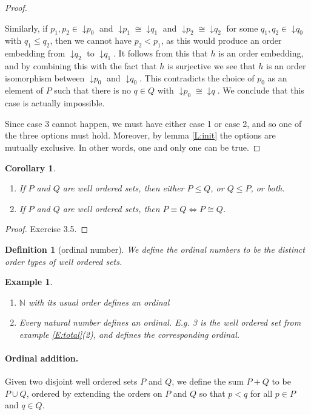 \documentclass{article}
\theoremstyle{plain}
\newtheorem{definition}[theorem]{Definition}{\bfseries}{\upshape}
\newtheorem{example}[theorem]{Example}{\bfseries}{\upshape}
\newtheorem{corollary}[theorem]{Corollary}{\bfseries}{\upshape}
\newcommand{\bN}{\mathbb{N}}
\DeclareMathOperator{\ISp}{\downarrow \mathit{p}}
\DeclareMathOperator{\ISq}{\downarrow \mathit{q}}
\begin{document}
\begin{proof}
\begin{itemize}
\begin{itemize}
Similarly, if $p_1,p_2\in \ISp_0$ and $\ISp_1 \cong \ISq_1$ and $\ISp_2 \cong \ISq_2$ for some $q_1,q_2\in \ISq_0$ with $q_1\leq q_2$, then we cannot have $p_2< p_1$, as this would produce an order embedding from $\ISq_2$ to $\ISq_1$.  It follows from this that $h$ is an order embedding, and by combining this with the fact that $h$ is surjective we see that $h$ is an order isomorphism between $\ISp_0$ and $\ISq_0$. This contradicts the choice of $p_0$ as an element of $P$ such that there is no $q\in Q$ with $\ISp_0\cong \ISq$. We conclude that this case is actually impossible.
\end{itemize}
\end{itemize}
Since case 3 cannot happen, we must have either case 1 or case 2, and so one of the three options must hold. Moreover, by lemma \ref{L:init} the options are mutually exclusive. In other words, one and only one can be true.  
\end{proof}

\begin{corollary}\label{C:isom}\mbox{}
\begin{enumerate}
\item If $P$ and $Q$ are well ordered sets, then either $P\leq Q$, or $Q\leq P$, or both.
\item If $P$ and $Q$ are well ordered sets, then $P\equiv Q\iff P\cong Q$.
\end{enumerate}
\end{corollary}
\begin{proof}
Exercise 3.5.
\end{proof}

\begin{definition}[ordinal number]
We define the \emph{ordinal numbers} to be the distinct order types of well ordered sets.  
\end{definition}

\begin{example}\mbox{}
\begin{enumerate}
\item $\bN$ with its usual order defines an ordinal
\item Every natural number defines an ordinal. E.g. 3 is the well ordered set from example \ref{E:total}(2), and defines the corresponding ordinal. 
\end{enumerate}
\end{example}

\paragraph{Ordinal addition.} 
Given two disjoint well ordered sets $P$ and $Q$, we define the sum $P+Q$ to be $P\cup Q$, ordered by extending the orders on $P$ and $Q$ so that $p<q$ for all $p\in P$ and $q\in Q$. 
\end{document}
